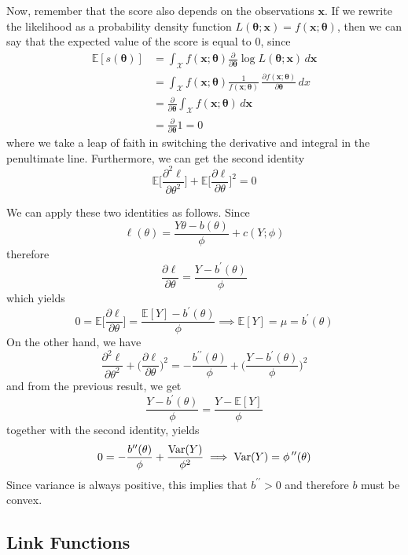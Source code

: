       Now, remember that the score also depends on the observations $\mathbf{x}$. If we rewrite the likelihood as a probability density function $L(\boldsymbol{\theta}; \mathbf{x}) = f(\mathbf{x}; \boldsymbol{\theta})$, then we can say that the expected value of the score is equal to $0$, since 
      \begin{align*}
       \mathbb{E}[s(\boldsymbol{\theta})] & = \int_\mathcal{X} f(\mathbf{x}; \boldsymbol{\theta}) \frac{\partial}{\partial \boldsymbol{\theta}} \log L (\boldsymbol{\theta}; \mathbf{x}) \,d\mathbf{x} \\
       & = \int_\mathcal{X} f(\mathbf{x}; \boldsymbol{\theta}) \frac{1}{f(\mathbf{x}; \boldsymbol{\theta})} \, \frac{\partial f(\mathbf{x}; \boldsymbol{\theta})}{\partial \boldsymbol{\theta}} \,dx \\
       & = \frac{\partial}{\partial \boldsymbol{\theta}} \int_\mathcal{X} f(\mathbf{x}; \boldsymbol{\theta}) \,d \mathbf{x} \\
       & = \frac{\partial}{\partial \boldsymbol{\theta}} 1 = 0
      \end{align*}
      where we take a leap of faith in switching the derivative and integral in the penultimate line. Furthermore, we can get the second identity 
      \[\mathbb{E}\bigg[ \frac{\partial^2 \ell}{\partial \theta^2} \bigg] + \mathbb{E} \bigg[ \frac{\partial \ell}{\partial \theta} \bigg]^2 = 0\]

      We can apply these two identities as follows. Since 
      \[\ell (\theta) = \frac{Y \theta - b(\theta)}{\phi} + c(Y ; \phi)\]
      therefore 
      \[\frac{\partial \ell}{\partial \theta} = \frac{Y - b^\prime(\theta)}{\phi}\]
      which yields 
      \[0 = \mathbb{E} \bigg[ \frac{\partial \ell}{\partial \theta} \bigg] = \frac{\mathbb{E}[Y] - b^\prime(\theta)}{\phi} \implies \mathbb{E}[Y] = \mu = b^\prime(\theta)\]
      On the other hand, we have 
      \[\frac{\partial^2 \ell}{\partial \theta^2} + \bigg( \frac{\partial \ell}{\partial \theta} \bigg)^2 = -\frac{b^{\prime\prime} (\theta)}{\phi} + \bigg(\frac{Y - b^\prime (\theta)}{\phi} \bigg)^2\]
      and from the previous result, we get 
      \[\frac{Y - b^\prime(\theta)}{\phi} = \frac{Y - \mathbb{E}[Y]}{\phi}\]
      together with the second identity, yields 
      \[0 = -\frac{b^{\prime\prime}(\theta)}{\phi} + \frac{\Var(Y)}{\phi^2} \implies \Var(Y) = \phi \, ^{\prime\prime} (\theta)\]
      Since variance is always positive, this implies that $b^{\prime\prime} > 0$ and therefore $b$ must be convex. 

\subsection{Link Functions}

